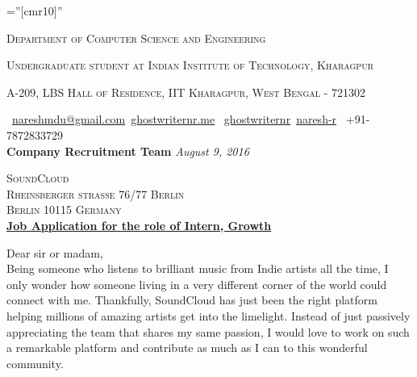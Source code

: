 \documentclass[a4paper,10pt]{extarticle} %
\begin{document}
\pagestyle{empty} %

\font\fb=''[cmr10]'' %


\par{\par} %
\par{\centering\large {\textsc{Department of Computer Science and Engineering}}\par}\large
\par{\centering\large {\textsc{Undergraduate student at Indian Institute of Technology, Kharagpur}}\par}\large
\par{\centering\large {\textsc{A-209, LBS Hall of Residence, IIT Kharagpur, West Bengal - 721302}}\par}\large
\hspace{0.5cm}\normalsize \faEnvelope\ {\href{mailto:nareshmdu@gmail.com}{nareshmdu@gmail.com}}\hfill \normalsize  \faGlobe\ {\href{http://ghostwriternr.me/}{ghostwriternr.me}} \hfill \normalsize \faGithub\ {\href{https://github.com/ghostwriternr}{ghostwriternr}}\hfill \normalsize  \faLinkedinSquare\ {\href{https://www.linkedin.com/in/naresh-r-464a8b8b}{naresh-r}} \hfill {\faPhone\ +91-7872833729} \hspace{0.5cm} \\[10pt]

\textbf{\large{Company Recruitment Team}} \hfill \textit{August 9, 2016}

\textsc{SoundCloud} \\
\textsc{Rheinsberger straße 76/77 Berlin}\\
\textsc{Berlin 10115 Germany} \\

\underline{\textbf{Job Application for the role of Intern, Growth}}

Dear sir or madam,\\

Being someone who listens to brilliant music from Indie artists all the time, I only wonder how someone living in a very different corner of the world could connect with me. Thankfully, SoundCloud has just been the right platform helping millions of amazing artists get into the limelight. Instead of just passively appreciating the team that shares my same passion, I would love to work on such a remarkable platform and contribute as much as I can to this wonderful community. \\
\end{document}
